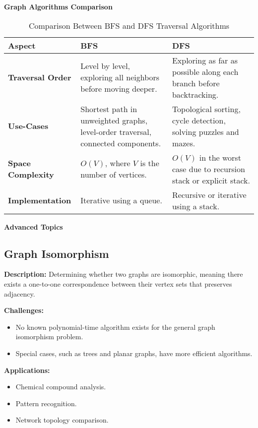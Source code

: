 \textbf{Graph Algorithms Comparison}

\begin{table}[ht]
    \centering
    \begin{tabular}{|l|p{5cm}|p{5cm}|}
        \hline
        \textbf{Aspect} & \textbf{BFS} & \textbf{DFS} \\
        \hline
        \textbf{Traversal Order} & Level by level, exploring all neighbors before moving deeper. & Exploring as far as possible along each branch before backtracking. \\
        \hline
        \textbf{Use-Cases} & Shortest path in unweighted graphs, level-order traversal, connected components. & Topological sorting, cycle detection, solving puzzles and mazes. \\
        \hline
        \textbf{Space Complexity} & \(O(V)\), where \(V\) is the number of vertices. & \(O(V)\) in the worst case due to recursion stack or explicit stack. \\
        \hline
        \textbf{Implementation} & Iterative using a queue. & Recursive or iterative using a stack. \\
        \hline
    \end{tabular}
    \caption{Comparison Between BFS and DFS Traversal Algorithms}
    \label{tab:bfs_vs_dfs}
\end{table}

\textbf{Advanced Topics}

\subsection{Graph Isomorphism}

\textbf{Description:}  
Determining whether two graphs are isomorphic, meaning there exists a one-to-one correspondence between their vertex sets that preserves adjacency.

\textbf{Challenges:}
\begin{itemize}
    \item No known polynomial-time algorithm exists for the general graph isomorphism problem.
    \item Special cases, such as trees and planar graphs, have more efficient algorithms.
\end{itemize}

\textbf{Applications:}
\begin{itemize}
    \item Chemical compound analysis.
    \item Pattern recognition.
    \item Network topology comparison.
\end{itemize}

